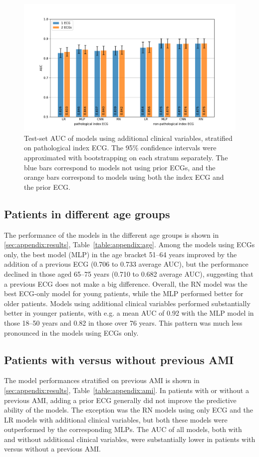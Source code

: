 \documentclass[preprint]{elsarticle}
\begin{document}
\begin{figure}[h!]
\includegraphics[width=\linewidth]{figures/path_results.pdf}
\caption{Test-set AUC of models using additional clinical variables, stratified on pathological index ECG. The 95\% confidence intervals were approximated with bootstrapping on each stratum separately. The blue bars correspond to models not using prior ECGs, and the orange bars correspond to models using both the index ECG and the prior ECG.}
\label{fig:pathresults}
\end{figure}

\subsection{Patients in different age groups}
The performance of the models in the different age groups is shown in \ref{sec:appendix:results}, Table~\ref{table:appendix:age}. Among the models using ECGs only, the best model (MLP) in the age bracket 51--64 years improved by the addition of a previous ECG (0.706 to 0.733 average AUC), but the performance declined in those aged 65--75 years (0.710 to 0.682 average AUC), suggesting that a previous ECG does not make a big difference. Overall, the RN model was the best ECG-only model for young patients, while the MLP performed better for older patients. Models using additional clinical variables performed substantially better in younger patients, with e.g. a mean AUC of 0.92 with the MLP model in those 18--50 years and 0.82 in those over 76 years. This pattern was much less pronounced in the models using ECGs only.

\subsection{Patients with versus without previous AMI}
The model performances stratified on previous AMI is shown in \ref{sec:appendix:results}, Table~\ref{table:appendix:ami}. In patients with or without a previous AMI, adding a prior ECG generally did not improve the predictive ability of the models. The exception was the RN models using only ECG and the LR models with additional clinical variables, but both these models were outperformed by the corresponding MLPs. The AUC of all models, both with and without additional clinical variables, were substantially lower in patients with versus without a previous AMI. 
\end{document}
